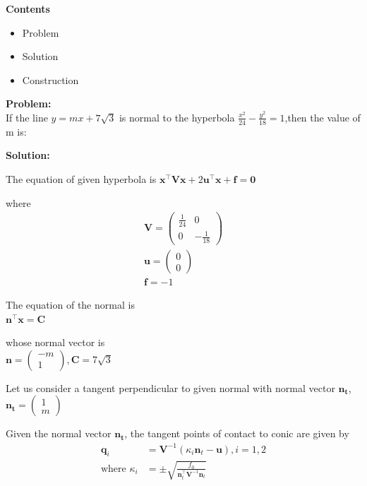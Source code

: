 \documentclass[8pt,a4paper]{report}
\newcommand{\myvec}[1]{\ensuremath{\begin{pmatrix}#1\end{pmatrix}}}
\let\vec\mathbf
\begin{document}
\begin{multicols}{2}


\raggedright \Large \textbf{Contents} \vspace{2mm}
\begin{itemize}
\raggedright \item Problem \item Solution\item Construction
\end{itemize}\vspace {5mm}
 

\raggedright \Large \textbf{Problem:} \vspace{2mm}
	\\  If the line $y = mx+7\sqrt{3}$ is normal to the hyperbola $\frac{x^2}{24}-\frac{y^2}{18} =1$,then the value of m is:\vspace{4mm}
\\\raggedright\Large \textbf{Solution:} \vspace{2mm}
	\\ \raggedright The equation of given hyperbola is \centering $\vec{x^{\top}}\vec{V}\vec{x} +2\vec{u^{\top}}\vec{x} + \vec{f} = \textbf{0}$ \\ 
\raggedright where\begin{align}
    \vec{V} = \myvec{\frac{1}{24}&0\\0&-\frac{1}{18}}\\
    \vec{u} = \myvec{0\\0}\\
    \vec{f} = -1
\end{align}
\raggedright The equation of the normal is\\ \centering$\vec{n^{\top}}\vec{x} = \textbf{C}$\\
 \raggedright whose normal vector is \\ \centering$\vec{n} = \myvec{-m\\1} , \textbf{C} = 7\sqrt{3}$\\
\raggedright Let us consider a tangent perpendicular to given normal with normal vector $\vec{n_t}$, \\
\centering $\vec{n_t} = \myvec{1\\m} $\\
\raggedright   Given the normal vector $\vec{n_t}$, the tangent points of contact to conic are given by\\
\begin{align}
\vec{q}_i &= \vec{V}^{-1}(\kappa_i \vec{n}_t-\vec{u}), i = 1,2\\
\text{where }\kappa_i &= \pm \sqrt{\frac{f_0}{\vec{n}_t^{\top}\vec{V}^{-1}\vec{n}_t}}

\end{align}
\end{multicols}
\end{document}
